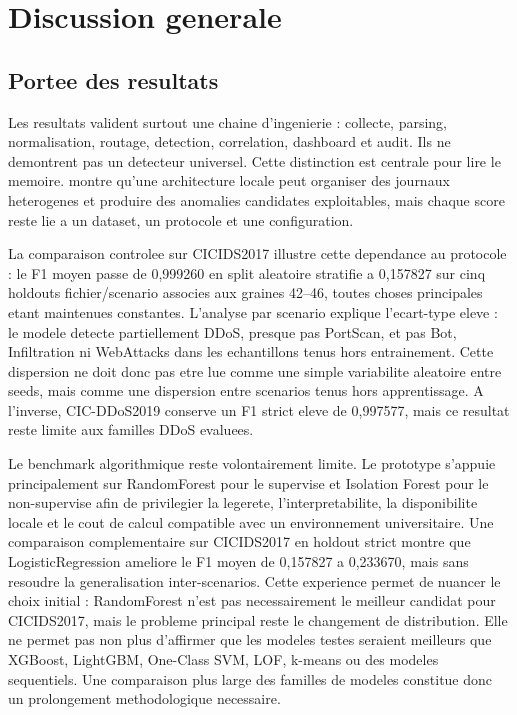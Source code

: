 \chapter{Discussion generale}

\section{Portee des resultats}
Les resultats valident surtout une chaine d'ingenierie : collecte, parsing, normalisation, routage, detection, correlation, dashboard et audit. Ils ne demontrent pas un detecteur universel. Cette distinction est centrale pour lire le memoire. \logminer{} montre qu'une architecture locale peut organiser des journaux heterogenes et produire des anomalies candidates exploitables, mais chaque score reste lie a un dataset, un protocole et une configuration.

La comparaison controlee sur CICIDS2017 illustre cette dependance au protocole : le F1 moyen passe de 0,999260 en split aleatoire stratifie a 0,157827 sur cinq holdouts fichier/scenario associes aux graines 42--46, toutes choses principales etant maintenues constantes. L'analyse par scenario explique l'ecart-type eleve : le modele detecte partiellement DDoS, presque pas PortScan, et pas Bot, Infiltration ni WebAttacks dans les echantillons tenus hors entrainement. Cette dispersion ne doit donc pas etre lue comme une simple variabilite aleatoire entre seeds, mais comme une dispersion entre scenarios tenus hors apprentissage. A l'inverse, CIC-DDoS2019 conserve un F1 strict eleve de 0,997577, mais ce resultat reste limite aux familles DDoS evaluees.

Le benchmark algorithmique reste volontairement limite. Le prototype s'appuie principalement sur RandomForest pour le supervise et Isolation Forest pour le non-supervise afin de privilegier la legerete, l'interpretabilite, la disponibilite locale et le cout de calcul compatible avec un environnement universitaire. Une comparaison complementaire sur CICIDS2017 en holdout strict montre que LogisticRegression ameliore le F1 moyen de 0,157827 a 0,233670, mais sans resoudre la generalisation inter-scenarios. Cette experience permet de nuancer le choix initial : RandomForest n'est pas necessairement le meilleur candidat pour CICIDS2017, mais le probleme principal reste le changement de distribution. Elle ne permet pas non plus d'affirmer que les modeles testes seraient meilleurs que XGBoost, LightGBM, One-Class SVM, LOF, k-means ou des modeles sequentiels. Une comparaison plus large des familles de modeles constitue donc un prolongement methodologique necessaire.

